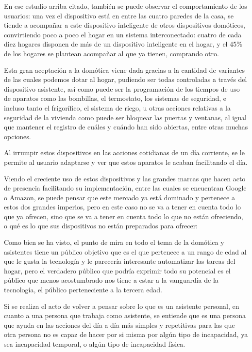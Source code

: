En ese estudio arriba citado, también se puede observar el comportamiento de los usuarios: una vez el dispositivo está en entre las cuatro paredes de la casa, se tiende a acompañar a este dispositivo inteligente de otros dispositivos domóticos, convirtiendo poco a poco el hogar en un sistema interconectado: cuatro de cada diez hogares disponen de más de un dispositivo inteligente en el hogar, y el 45\% de los hogares se plantean acompañar al que ya tienen, comprando otro.

Esta gran aceptación a la domótica viene dada gracias a la cantidad de variantes de las cuales podemos dotar al hogar, pudiendo ser todas controladas a través del dispositivo asistente, así como puede ser la programación de los tiempos de uso de aparatos como las bombillas, el termostato, los sistemas de seguridad, e incluso tanto el frigorífico, el sistema de riego, u otras acciones relativas a la seguridad de la vivienda como puede ser bloquear las puertas y ventanas, al igual que mantener el registro de cuáles y cuándo han sido abiertas, entre otras muchas opciones.

Al irrumpir estos dispositivos en las acciones cotidianas de un día corriente, se le permite al usuario adaptarse y ver que estos aparatos le acaban facilitando el día.

Viendo el creciente uso de estos dispositivos y las grandes marcas que hacen acto de presencia facilitando su implementación, entre las cuales se encuentran Google o Amazon, se puede pensar que este mercado ya está dominado y pertenece a estos dos grandes imperios, pero en este caso no se va a tener en cuenta todo lo que ya ofrecen, sino que se va a tener en cuenta todo lo que no están ofreciendo, o qué es lo que sus dispositivos no están preparados para ofrecer:

Como bien se ha visto, el punto de mira en todo el tema de la domótica y asistentes tiene un público objetivo que es el que pertenece a un rango de edad al que le gusta la tecnología y le parecería interesante automatizar las tareas del hogar, pero el verdadero público que podría exprimir todo su potencial es el público que menos acostumbrado nos tiene a estar a la vanguardia de la tecnología, el público perteneciente a la tercera edad.

Si se realiza el acto de volver a pensar sobre lo que es un asistente personal, en cuanto a una persona que trabaja como asistente, se entiende que es una persona que ayuda en las acciones del día a día más simples y repetitivas para las que otra persona no es capaz de hacer por si misma por algún tipo de incapacidad, ya sea incapacidad temporal, o algún tipo de incapacidad física.

